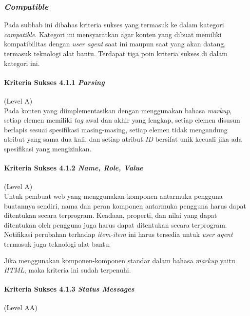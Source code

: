 \subsubsection{\textit{Compatible}}
\label{sec:compatible}
Pada subbab ini dibahas kriteria sukses yang termasuk ke dalam kategori \textit{compatible}. Kategori ini mensyaratkan agar konten yang dibuat memiliki kompatibilitas dengan \textit{user agent} saat ini maupun saat yang akan datang, termasuk teknologi alat bantu. Terdapat tiga poin kriteria sukses di dalam kategori ini.

\paragraph{Kriteria Sukses 4.1.1 \textit{Parsing}}
\label{sec:kriteria_sukses_4.1.1}
(Level A)\\

Pada konten yang diimplementasikan dengan menggunakan bahasa \textit{markup}, setiap elemen memiliki \textit{tag} awal dan akhir yang lengkap, setiap elemen disusun berlapis sesuai spesifikasi masing-masing, setiap elemen tidak mengandung atribut yang sama dua kali, dan setiap atribut \textit{ID} bersifat unik kecuali jika ada spesifikasi yang mengizinkan.

\paragraph{Kriteria Sukses 4.1.2 \textit{Name, Role, Value}}
\label{sec:kriteria_sukses_4.1.2}
(Level A)\\

Untuk pembuat web yang menggunakan komponen antarmuka pengguna buatannya sendiri, nama dan peran komponen antarmuka pengguna harus dapat ditentukan secara terprogram. Keadaan, properti, dan nilai yang dapat ditentukan oleh pengguna juga harus dapat ditentukan secara terprogram. Notifikasi perubahan terhadap \textit{item-item} ini harus tersedia untuk \textit{user agent} termasuk juga teknologi alat bantu.

Jika menggunakan komponen-komponen standar dalam bahasa \textit{markup} yaitu \textit{HTML}, maka kriteria ini sudah terpenuhi.

\paragraph{Kriteria Sukses 4.1.3 \textit{Status Messages}}
\label{sec:kriteria_sukses_4.1.3}
(Level AA)\\

